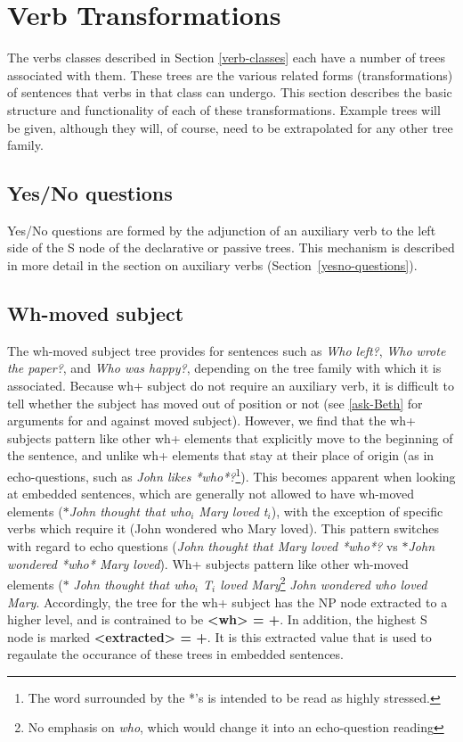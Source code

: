 \section{Verb Transformations}

The verbs classes described in Section \ref{verb-classes} each have a number of
trees associated with them.  These trees are the various related forms
(transformations) of sentences that verbs in that class can undergo.  This
section describes the basic structure and functionality of each of these
transformations.  Example trees will be given, although they will, of course,
need to be extrapolated for any other tree family.

\subsection{Yes/No questions}

Yes/No questions are formed by the adjunction of an auxiliary verb to the left
side of the S node of the declarative or passive trees.  This mechanism is
described in more detail in the section on auxiliary verbs
(Section~\ref{yesno-questions}).

\subsection{Wh-moved subject}

The wh-moved subject tree provides for sentences such as {\it Who left?}, {\it
Who wrote the paper?}, and {\it Who was happy?}, depending on the tree family
with which it is associated.  Because wh+ subject do not require an auxiliary
verb, it is difficult to tell whether the subject has moved out of position or
not (see \ref{ask-Beth} for arguments for and against moved subject).  However,
we find that the wh+ subjects pattern like other wh+ elements that explicitly
move to the beginning of the sentence, and unlike wh+ elements that stay at
their place of origin (as in echo-questions, such as {\it John likes
*who*?}\footnote{The word surrounded by the *'s is intended to be read as
highly stressed.}).  This becomes apparent when looking at embedded sentences,
which are generally not allowed to have wh-moved elements ($\ast${\it John
thought that who$_i$ Mary loved t$_i$}), with the exception of specific verbs
which require it (John wondered who Mary loved).  This pattern switches with
regard to echo questions ({\it John thought that Mary loved *who*?} vs
$\ast${\it John wondered *who* Mary loved}).  Wh+ subjects pattern like other
wh-moved elements ($\ast$ {\it John thought that who$_i$ T$_i$ loved
Mary}\footnote{No emphasis on {\it who}, which would change it into an
echo-question reading} {\it John wondered who loved Mary}.  Accordingly, the
tree for the wh+ subject has the NP node extracted to a higher level, and is
contrained to be {\bf <wh> = +}.  In addition, the highest S node is marked
{\bf <extracted> = +}.  It is this extracted value that is used to regaulate
the occurance of these trees in embedded sentences.




